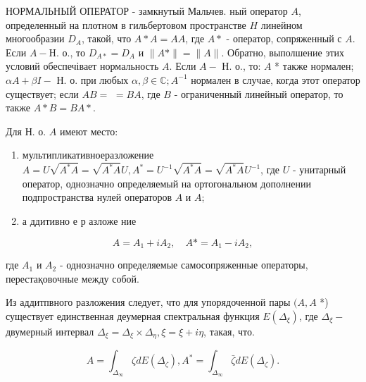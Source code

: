 \documentclass[10pt]{article}
\begin{document}
НОРМАЛЬНЫЙ ОПЕРАТОР - замкнутый Мальчев. ный оператор $A$, определенный на плотном в гильбертовом пространстве $H$ линейном многообразии $D_{A}$, такой, что $A * A=A A$, где $A *$ - оператор, сопряженный с $A$. Если $A-\mathrm{H}$. о., то $D_{A *}=D_{A}$ и $\|A *\|=\|A\|$. Обратно, выполшение этих условий обеспечівает нормальность $A$. Если $A-$ Н. о., то: $A$ * также нормален; $\alpha A+\beta I-$ Н. о. при любых $\alpha, \beta \in \mathbb{C} ; A^{-1}$ нормален в случае, когда этот оператор существует; если $A B=$ $=B A$, где $B$ - ограниченный линейный оператор, то также $A * B=B A *$.



Для Н. о. $A$ имеют место:



\begin{enumerate}

  \item мультипликативноеразложение $A=U \sqrt{A^{*} A}=\sqrt{A^{*} A} U, A^{*}=U^{-1} \sqrt{A^{*} A}=\sqrt{A^{*} A} U^{-1}$, где $U$ - унитарный оператор, однозначно определяемый на ортогональном дополнении подпространства нулей операторов $A$ и $A$;



  \item а ддитивно е р азложе ние



\end{enumerate}



\[

A=A_{1}+i A_{2}, \quad A *=A_{1}-i A_{2},

\]



где $A_{1}$ и $A_{2}$ - однозначно определяемые самосопряженные операторы, перестақовочные между собой.



Из аддитпвного разложения следует, что для упорядоченной пары $(A, A$ *) существует единственная деумерная спектральная функция $E\left(\Delta_{\xi}\right)$, где $\Delta_{\xi}-$ двумерный интервал $\Delta_{\xi}=\Delta_{\xi} \times \Delta_{\eta}, \xi=\xi+i \eta$, такая, что.



\[

A=\int_{\Delta_{\infty}} \zeta d E\left(\Delta_{\zeta}\right), A^{*}=\int_{\Delta_{\infty}} \bar{\zeta} d E\left(\Delta_{\zeta}\right) .

\]
\end{document}

